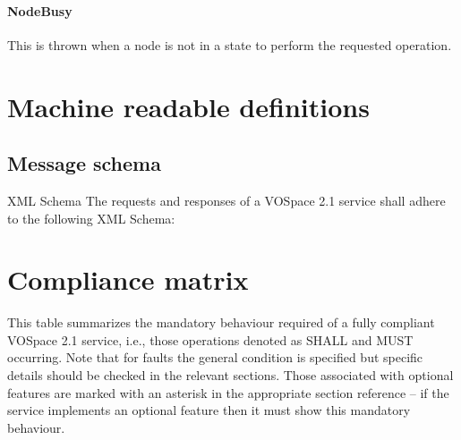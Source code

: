 \documentclass[11pt,a4paper]{ivoa}
\begin{document}
\paragraph{NodeBusy}
This is thrown when a node is not in a state to perform the requested operation.

\appendix

\section{Machine readable definitions}
\label{sec:machine readable definitions}
\subsection{Message schema}
\label{subsec:message schema}
XML Schema
The requests and responses of a VOSpace 2.1 service shall adhere to the following XML Schema:



\section{Compliance matrix}
\label{sec:compliance matrix}
This table summarizes the mandatory behaviour required of a fully compliant VOSpace 2.1 service, i.e., those operations denoted as SHALL and MUST occurring. Note that for faults the general condition is specified but specific details should be checked in the relevant sections. Those associated with optional features are marked with an asterisk in the appropriate section reference -- if the service implements an optional feature then it must show this mandatory behaviour.
\end{document}
